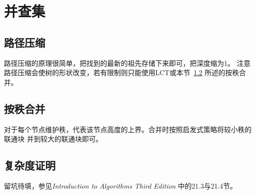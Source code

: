 \section{并查集}\label{DSU}
\subsection{路径压缩}
路径压缩的原理很简单，把找到的最新的祖先存储下来即可，把深度缩为1。
注意路径压缩会使树的形状改变，若有限制则只能使用LCT或本节~\ref{RankMerge}
所述的按秩合并。
\subsection{按秩合并}\label{RankMerge}
对于每个节点维护秩，代表该节点高度的上界。合并时按照启发式策略将较小秩的联通块
并到较大的联通块即可。
\subsection{复杂度证明}
留坑待填，参见\emph{Introduction to Algorithms Third Edition}\cite{ITA3}
中的21.3与21.4节。
